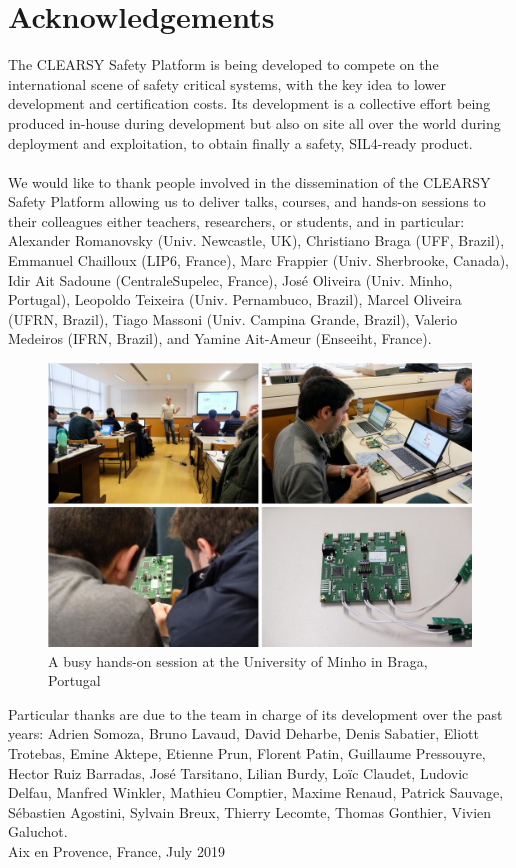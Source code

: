 \section{Acknowledgements}
The CLEARSY Safety Platform is being developed to compete on the international scene of safety critical systems, with the key idea to lower development and certification costs. Its development is a collective effort being produced in-house during development but also on site all over the world during deployment and exploitation, to obtain finally a safety, SIL4-ready product.\\
\\
We would like to thank people involved in the dissemination of the CLEARSY Safety Platform allowing us to deliver talks, courses, and hands-on sessions to their colleagues either teachers, researchers, or students, and in particular: Alexander Romanovsky (Univ. Newcastle, UK), Christiano Braga (UFF, Brazil), Emmanuel Chailloux (LIP6, France), Marc Frappier (Univ. Sherbrooke, Canada), Idir Ait Sadoune (CentraleSupelec, France), José Oliveira (Univ. Minho, Portugal), Leopoldo Teixeira (Univ. Pernambuco, Brazil), Marcel Oliveira (UFRN, Brazil), Tiago Massoni (Univ. Campina Grande, Brazil), Valerio Medeiros (IFRN, Brazil), and Yamine Ait-Ameur (Enseeiht, France). \\

\begin{figure}[h]
\centering\includegraphics[scale=0.3]{Pictures/FOREWORD-TALK.jpg}
\caption{A busy hands-on session at the University of Minho in Braga, Portugal}
\end{figure}


Particular thanks are due to the team in charge of its development over the past years: Adrien Somoza, Bruno Lavaud, David Deharbe, Denis Sabatier, Eliott Trotebas, Emine Aktepe, Etienne Prun, Florent Patin, Guillaume Pressouyre, Hector Ruiz Barradas, José Tarsitano, Lilian Burdy, Loïc Claudet, Ludovic Delfau, Manfred Winkler, Mathieu Comptier, Maxime Renaud, Patrick Sauvage, Sébastien Agostini, Sylvain Breux, Thierry Lecomte, Thomas Gonthier, Vivien Galuchot.\\

%
\hspace*{\fill} Aix en Provence, France, July 2019
